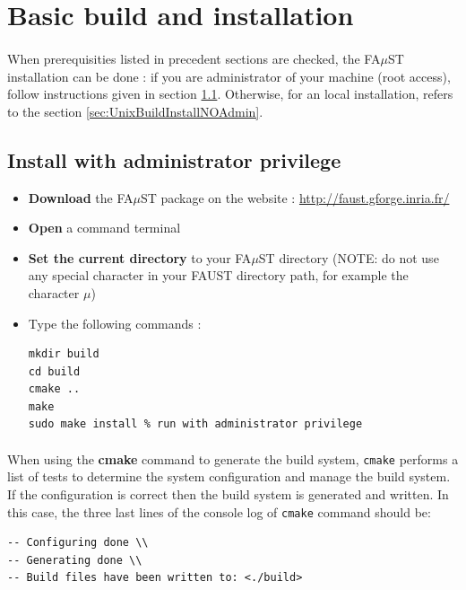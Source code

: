 \section{Basic build and installation}\label{sec:UnixBuildInstall}
\paragraph{}When prerequisities listed in precedent sections are checked, the FA$\mu$ST installation can be done : 
if you are administrator of your machine (root access), follow instructions given in section \ref{sec:UnixBuildInstallAdmin}. Otherwise, for an local installation, refers to the section \ref{sec:UnixBuildInstallNOAdmin}. 

\subsection{Install with administrator privilege}\label{sec:UnixBuildInstallAdmin}

\begin{itemize}
\item \textbf{Download} the FA$\mu$ST package on the website :  \url{http://faust.gforge.inria.fr/}
\item \textbf{Open} a command terminal
\item \textbf{Set the current directory} to your FA$\mu$ST directory (NOTE: do not use any special character in your FAUST directory path, for example the character $\mu$)
\item Type the following commands : 
\begin{lstlisting}
mkdir build
cd build
cmake ..
make
sudo make install % run with administrator privilege
\end{lstlisting}
\end{itemize}

\paragraph{}When using the \textbf{cmake} command to generate the build system, \texttt{cmake} performs a list of tests to determine the system configuration and manage the build system. If the configuration is correct then the build system is generated and written. In this case, the three last lines of the console log of \texttt{cmake} command should be: \\
\begin{lstlisting}
-- Configuring done \\
-- Generating done \\
-- Build files have been written to: <./build>
\end{lstlisting}

